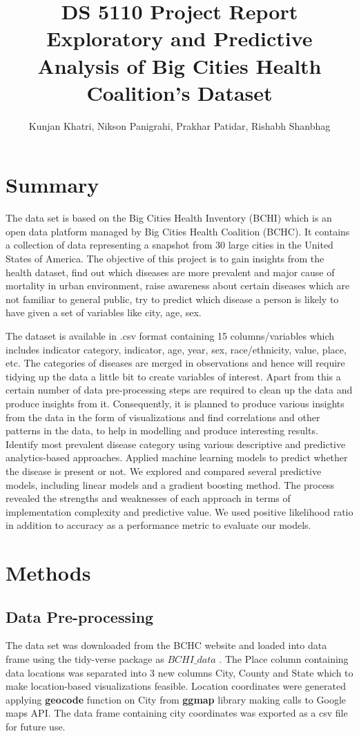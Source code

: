 \documentclass[11pt]{article}
\title{\textbf{DS 5110 Project Report} \\ Exploratory and Predictive Analysis of Big Cities Health Coalition’s Dataset}
\author{Kunjan Khatri, Nikson Panigrahi, Prakhar Patidar, Rishabh Shanbhag }
\date{}
\affil{Northeastern University, Boston, Massachusetts}
\begin{document}
  \maketitle
  \begin{multicols}{2}
    \section{Summary}
    The data set is based on the Big Cities Health Inventory (BCHI) \cite{bchc} which is an open data platform managed by Big Cities Health Coalition (BCHC)\cite{bchc}. It contains a collection of data representing a snapshot from 30 large cities in the United States of America.  The objective of this project is to gain insights from the health dataset, find out which diseases are more prevalent and major cause of mortality in urban environment, raise awareness about certain diseases which are not familiar to general public, try to predict which disease a person is likely to have given a set of variables like city, age, sex.

    The dataset is available in .csv format containing 15 columns/variables which includes indicator category, indicator, age, year, sex, race/ethnicity, value, place, etc. The categories of diseases are merged in observations and hence will require tidying up the data a little bit to create variables of interest. Apart from this a certain number of data pre-processing steps are required to clean up the data and produce insights from it. Consequently, it is planned to produce various insights from the data in the form of visualizations and find correlations and other patterns in the data, to help in modelling and produce interesting results. Identify most prevalent disease category using various descriptive and predictive analytics-based approaches. Applied machine learning models to predict whether the disease is present or not. We explored and compared several predictive models, including linear models and a gradient boosting method. The process revealed the strengths and weaknesses of each approach in terms of implementation complexity and predictive value. We used positive likelihood ratio in addition to accuracy as a performance metric to evaluate our models. 

    \section{Methods}
    \subsection{Data Pre-processing}
    The data set was downloaded from the BCHC \cite{bchc} website and loaded into data frame using the tidy-verse package as $BCHI\_data$ . The Place column containing data locations was separated into 3 new columns City, County and State which to make location-based visualizations feasible. Location coordinates were generated applying \textbf{geocode} function on City from \textbf{ggmap} \cite{spgg} library making calls to Google maps API. The data frame containing city coordinates was exported as a csv file for future use.


\end{multicols}
\end{document}

